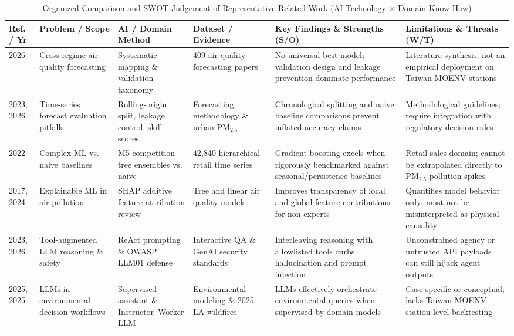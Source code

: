 \begin{table}[!t]
\centering
\footnotesize
\setlength{\tabcolsep}{4pt}
\caption{Organized Comparison and SWOT Judgement of Representative Related Work (AI Technology $\times$ Domain Know-How)}
\label{tab:literature}
\begin{tabular}{L{1.4cm}L{2.4cm}L{2.6cm}L{2.5cm}L{4.0cm}L{3.7cm}}
\toprule
\textbf{Ref. / Yr} & \textbf{Problem / Scope} & \textbf{AI / Domain Method} & \textbf{Dataset / Evidence} & \textbf{Key Findings \& Strengths (S/O)} & \textbf{Limitations \& Threats (W/T)} \\
\midrule
\cite{chianese2026} 2026 & Cross-regime air quality forecasting & Systematic mapping \& validation taxonomy & 409 air-quality forecasting papers & No universal best model; validation design and leakage prevention dominate performance & Literature synthesis; not an empirical deployment on Taiwan MOENV stations \\
\cite{hewamalage2023} 2023, \cite{lu2026} 2026 & Time-series forecast evaluation pitfalls & Rolling-origin split, leakage control, skill scores & Forecasting methodology \& urban $\text{PM}_{2.5}$ & Chronological splitting and naive baseline comparisons prevent inflated accuracy claims & Methodological guidelines; require integration with regulatory decision rules \\
\cite{makridakis2022} 2022 & Complex ML vs. naive baselines & M5 competition tree ensembles vs. naive & 42,840 hierarchical retail time series & Gradient boosting excels when rigorously benchmarked against seasonal/persistence baselines & Retail sales domain; cannot be extrapolated directly to $\text{PM}_{2.5}$ pollution spikes \\
\cite{lundberg2017} 2017, \cite{houdou2024} 2024 & Explainable ML in air pollution & SHAP additive feature attribution review & Tree and linear air quality models & Improves transparency of local and global feature contributions for non-experts & Quantifies model behavior only; must not be misinterpreted as physical causality \\
\cite{yao2023} 2023, \cite{owasp2026} 2026 & Tool-augmented LLM reasoning \& safety & ReAct prompting \& OWASP LLM01 defense & Interactive QA \& GenAI security standards & Interleaving reasoning with allowlisted tools curbs hallucination and prompt injection & Unconstrained agency or untrusted API payloads can still hijack agent outputs \\
\cite{nie2025} 2025, \cite{gao2025} 2025 & LLMs in environmental decision workflows & Supervised assistant \& Instructor--Worker LLM & Environmental modeling \& 2025 LA wildfires & LLMs effectively orchestrate environmental queries when supervised by domain models & Case-specific or conceptual; lacks Taiwan MOENV station-level backtesting \\

\end{tabular}
\end{table}
